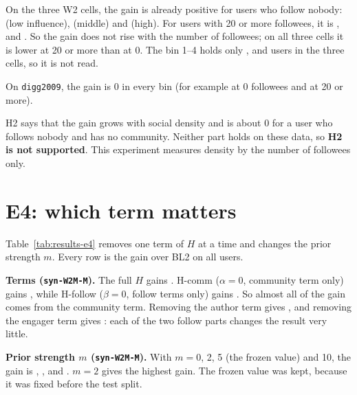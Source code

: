 On the three W2 cells, the gain is already positive for users who follow nobody: \eThreeWTwoLNdcgTenZeroGain{} (low influence), \eThreeWTwoMNdcgTenZeroGain{} (middle) and \eThreeWTwoHNdcgTenZeroGain{} (high). For users with 20 or more followees, it is \eThreeWTwoLNdcgTenTwentyPlusGain{}, \eThreeWTwoMNdcgTenTwentyPlusGain{} and \eThreeWTwoHNdcgTenTwentyPlusGain{}. So the gain does not rise with the number of followees; on all three cells it is lower at 20 or more than at 0. The bin 1--4 holds only \eThreeWTwoLNdcgTenOneFourN{}, \eThreeWTwoMNdcgTenOneFourN{} and \eThreeWTwoHNdcgTenOneFourN{} users in the three cells, so it is not read.

On \texttt{digg2009}, the gain is 0 in every bin (for example \eThreeDiggNdcgTenZeroGain{} at 0 followees and \eThreeDiggNdcgTenTwentyPlusGain{} at 20 or more).

H2 says that the gain grows with social density and is about 0 for a user who follows nobody and has no community. Neither part holds on these data, so \textbf{H2 is not supported}. This experiment measures density by the number of followees only.

\section{E4: which term matters}
\label{sec:results-e4}

Table~\ref{tab:results-e4} removes one term of $H$ at a time and changes the prior strength $m$. Every row is the gain over BL2 on all users.

\begin{table}[htbp]
  \centering
  \caption{E4: the terms of $H$ and the prior strength $m$, NDCG@10 (gain over BL2, all users).}
  \label{tab:results-e4}
  \small
  
\end{table}

\textbf{Terms (\texttt{syn-W2M-M}).} The full $H$ gains \eFourWTwoMNdcgHTenAllGain{}. H-comm ($\alpha = 0$, community term only) gains \eFourWTwoMNdcgHCommTenAllGain{}, while H-follow ($\beta = 0$, follow terms only) gains \eFourWTwoMNdcgHFollowTenAllGain{}. So almost all of the gain comes from the community term. Removing the author term gives \eFourWTwoMNdcgHNoauthorTenAllGain{}, and removing the engager term gives \eFourWTwoMNdcgHNoengagerTenAllGain{}: each of the two follow parts changes the result very little.

\textbf{Prior strength $m$ (\texttt{syn-W2M-M}).} With $m = 0$, 2, 5 (the frozen value) and 10, the gain is \eFourWTwoMNdcgHMZeroTenAllGain{}, \eFourWTwoMNdcgHMTwoTenAllGain{}, \eFourWTwoMNdcgHTenAllGain{} and \eFourWTwoMNdcgHMTenTenAllGain{}. $m = 2$ gives the highest gain. The frozen value was kept, because it was fixed before the test split.

